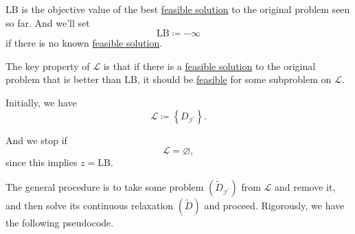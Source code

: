 \begin{note}
	\(\mathrm{LB} \) is the objective value of the best \hyperref[def:feasible-solution]{feasible solution} to the original problem seen so far. And we'll set
	\[
		\mathrm{LB} \coloneqq  -\infty
	\]
	if there is no known \hyperref[def:feasible-solution]{feasible solution}.
\end{note}
\begin{remark}
	The key property of \(\mathcal{L} \) is that if there is a \hyperref[def:feasible-solution]{feasible solution} to the original problem that is better than
	\(\mathrm{LB} \), it should be \hyperref[def:feasible-solution]{feasible} for some subproblem on \(\mathcal{L} \).

	\par Initially, we have
	\[
		\mathcal{L} \coloneqq \left\{D_{\mathcal{I}^\prime }\right\}.
	\]

	\par And we stop if
	\[
		\mathcal{L} = \varnothing,
	\]
	since this implies \(z = \mathrm{LB} \).
\end{remark}

The general procedure is to take some problem \((\widetilde{D}_{\mathcal{I}^\prime })\) from \(\mathcal{L}\) and remove it, and then solve
its continuous relaxation \((\widetilde{D})\) and proceed. Rigorously, we have the following pseudocode.

